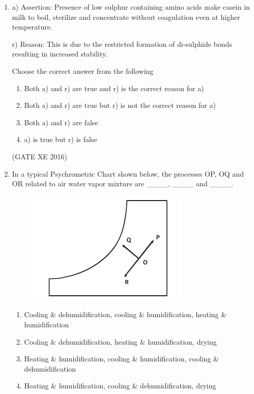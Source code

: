 \documentclass[12pt]{article}
\begin{document}
\begin{enumerate}
\item a) Assertion: Presence of low sulphur containing amino acids make casein in milk to boil, sterilize and concentrate without coagulation even at higher temperature. 

r) Reason: This is due to the restricted formation of di-sulphide bonds resulting in increased stability. 

Choose the correct answer from the following

\begin{enumerate}
\item Both a) and r) are true and r) is the correct reason for a)
\item Both a) and r) are true but r) is not the correct reason for a)
\item Both a) and r) are false
\item a) is true but r) is false
\end{enumerate}

(GATE XE 2016)

\item In a typical Psychrometric Chart shown below, the processes OP, OQ and OR related to air water vapor mixture are \_\_\_\_, \_\_\_\_ and \_\_\_\_.

\begin{figure}[H]
    \centering
    \includegraphics[width=0.5\columnwidth]{figs/ass3_g_q20.png}
    \caption{}
    \label{fig:placeholder}
\end{figure}

\begin{enumerate}
\item Cooling \& dehumidification, cooling \& humidification, heating \& humidification
\item Cooling \& dehumidification, heating \& humidification, drying
\item Heating \& humidification, cooling \& humidification, cooling \& dehumidification
\item Heating \& humidification, cooling \& dehumidification, drying
\end{enumerate}


\end{enumerate}
\end{document}
